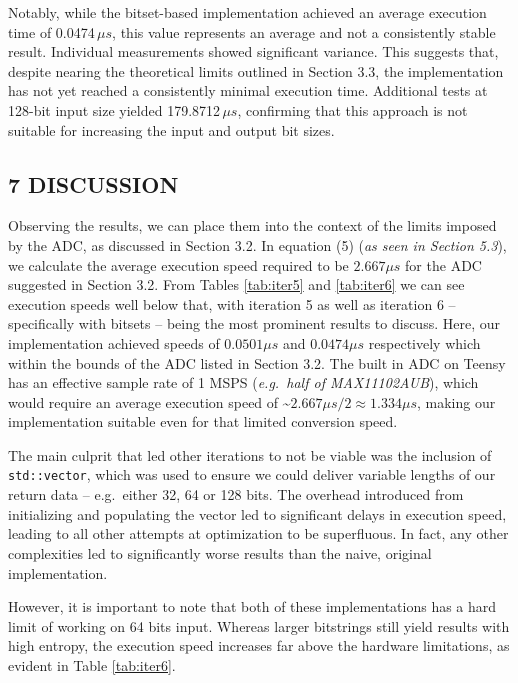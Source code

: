 Notably, while the bitset-based implementation achieved an average execution time of 0.0474\,\(\mu s\), this value represents an average and not a consistently stable result. Individual measurements showed significant variance. This suggests that, despite nearing the theoretical limits outlined in Section 3.3, the implementation has not yet reached a consistently minimal execution time. Additional tests at 128-bit input size yielded 179.8712\,\(\mu s\), confirming that this approach is not suitable for increasing the input and output bit sizes.

\subsection{7 DISCUSSION}\label{discussion}

Observing the results, we can place them into the context of the limits imposed by the ADC, as discussed in Section 3.2. In equation (5) (\emph{as seen in Section 5.3}), we calculate the average execution speed required to be \(2.667 \mu s\) for the ADC suggested in Section 3.2. From Tables \ref{tab:iter5} and \ref{tab:iter6} we can see execution speeds well below that, with iteration 5 as well as iteration 6 -- specifically with bitsets -- being the most prominent results to discuss. Here, our implementation achieved speeds of \(0.0501 \mu s\) and \(0.0474 \mu s\) respectively which within the bounds of the ADC listed in Section 3.2. The built in ADC on Teensy has an effective sample rate of 1 MSPS (\emph{e.g.~half of MAX11102AUB}), which would require an average execution speed of \textasciitilde{}\(2.667 \mu s / 2 \approx 1.334 \mu s\), making our implementation suitable even for that limited conversion speed.

The main culprit that led other iterations to not be viable was the inclusion of \texttt{std::vector}, which was used to ensure we could deliver variable lengths of our return data -- e.g.~either 32, 64 or 128 bits. The overhead introduced from initializing and populating the vector led to significant delays in execution speed, leading to all other attempts at optimization to be superfluous. In fact, any other complexities led to significantly worse results than the naive, original implementation.

However, it is important to note that both of these implementations has a hard limit of working on 64 bits input. Whereas larger bitstrings still yield results with high entropy, the execution speed increases far above the hardware limitations, as evident in Table \ref{tab:iter6}.

